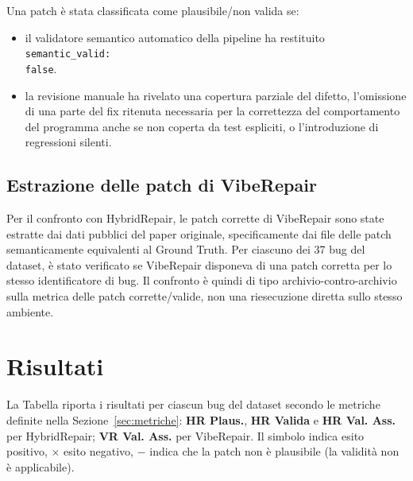Una patch è stata classificata come plausibile/non valida se:

\begin{itemize}
    \item il validatore semantico automatico della pipeline ha restituito \verb|semantic_valid:| \\\verb|false|.
    \item la revisione manuale ha rivelato una copertura parziale del difetto, l'omissione di una parte del fix
    ritenuta necessaria per la correttezza del comportamento del programma anche se non coperta da test espliciti,
    o l'introduzione di regressioni silenti.
\end{itemize}

\subsection{Estrazione delle patch di VibeRepair}

Per il confronto con HybridRepair, le patch corrette di VibeRepair sono state estratte dai dati pubblici del paper originale, specificamente dai file delle patch 
semanticamente equivalenti al Ground Truth. Per ciascuno dei 37 bug del dataset, è stato verificato se VibeRepair disponeva di una patch 
corretta per lo stesso identificatore di bug. Il confronto è quindi di tipo archivio-contro-archivio sulla metrica delle patch corrette/valide, 
non una riesecuzione diretta sullo stesso ambiente.

\newpage
\section{Risultati}

La Tabella riporta i risultati per ciascun bug del dataset secondo le metriche definite
nella Sezione~\ref{sec:metriche}: \textbf{HR Plaus.}, \textbf{HR Valida} e \textbf{HR Val. Ass.}
per HybridRepair; \textbf{VR Val. Ass.} per VibeRepair\cite{zhu2026specification}.
Il simbolo \checkmark{} indica esito positivo, $\times$ esito negativo,
$-$ indica che la patch non è plausibile (la validità non è applicabile).

